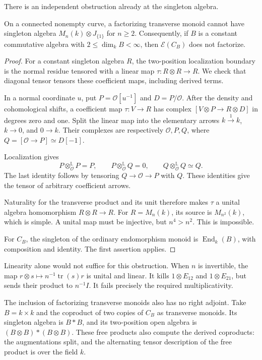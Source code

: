 There is an independent
obstruction already
at the singleton
algebra.

\begin{proposition}\label{v4-arith:centers:prop:matrix-actor}
On a connected nonempty
curve, a factorizing
transverse monoid
cannot have singleton
algebra
$M_n(k)\otimes J_{\{1\}}$
for $n\geq2$.
Consequently, if $B$
is a constant
commutative algebra
with $2\leq\dim_kB<\infty$,
then $\mathcal E(C_B)$
does not factorize.
\end{proposition}

\begin{proof}
For a constant
singleton algebra
$R$, the two-position
localization boundary
is the normal residue
tensored with a
linear map
$\tau:R\otimes R\to R$.
We check that
diagonal tensor
tensors these
coefficient maps,
including derived
terms.

In a normal coordinate
$u$, put
$P=\mathcal O[u^{-1}]$
and
$D=P/\mathcal O$.
After the density
and cohomological
shifts, a coefficient
map $\tau:V\to R$
has complex
$[V\otimes P\to R\otimes D]$
in degrees zero
and one.
Split the linear
map into the
elementary arrows
$k\xrightarrow1k$,
$k\to0$, and
$0\to k$.
Their complexes
are respectively
$\mathcal O,P,Q$,
where
$Q=[\mathcal O\to P]\simeq D[-1]$.

Localization gives
\[
 P\otimes^{\mathbb L}_{\mathcal O}P=P,\qquad
 P\otimes^{\mathbb L}_{\mathcal O}Q=0,\qquad
 Q\otimes^{\mathbb L}_{\mathcal O}Q\simeq Q.
\]
The last identity
follows by tensoring
$Q\to\mathcal O\to P$
with $Q$.
These identities
give the tensor
of arbitrary
coefficient arrows.

Naturality for
the transverse
product and its
unit therefore
makes $\tau$ a
unital algebra
homomorphism
$R\otimes R\to R$.
For $R=M_n(k)$,
its source is
$M_{n^2}(k)$,
which is simple.
A unital map
must be injective,
but $n^4>n^2$.
This is impossible.

For $C_B$, the
singleton of the
ordinary endomorphism
monoid is
$\operatorname{End}_k(B)$,
with composition
and identity.
The first assertion
applies.
\end{proof}

Linearity alone would
not suffice for this
obstruction. When
$n$ is invertible,
the map
$r\otimes s\mapsto
n^{-1}\operatorname{tr}(s)r$
is unital and linear.
It kills
$1\otimes E_{12}$
and
$1\otimes E_{21}$,
but sends their
product to
$n^{-1}I$.
It fails precisely
the required
multiplicativity.

The inclusion of
factorizing transverse
monoids also has
no right adjoint.
Take $B=k\times k$
and the coproduct
of two copies
of $C_B$ as
transverse monoids.
Its singleton
algebra is $B*B$,
and its two-position
open algebra is
$(B\otimes B)*(B\otimes B)$.
These free products
also compute the
derived coproducts:
the augmentations
split, and the
alternating tensor
description of the
free product is
over the field
$k$.

